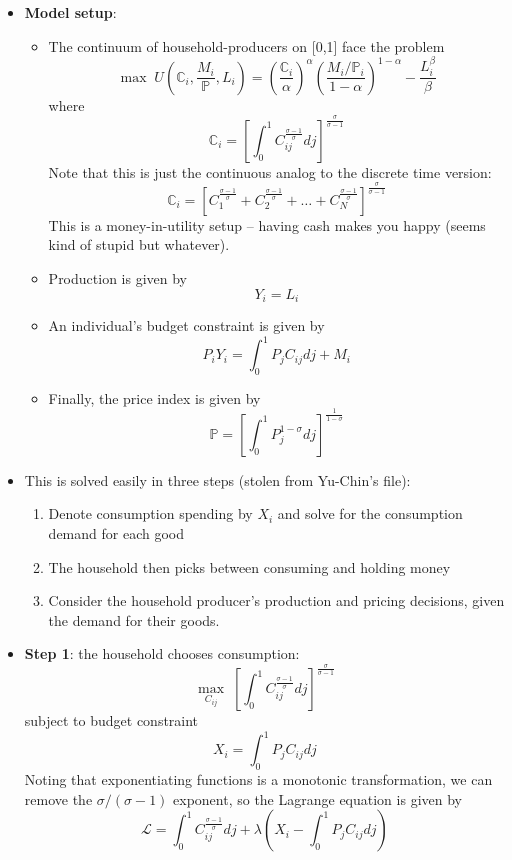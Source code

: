 \documentclass[12pt]{article}
\begin{document}
\begin{itemize}
    \item \textbf{Model setup}: 
    \begin{itemize}
        \item The continuum of household-producers on [0,1] face the problem
        \[\max\;U\left(\mathbb{C}_i, \frac{M_i}{\mathbb{P}}, L_i\right) = \left(\frac{\mathbb{C}_i}{\alpha}\right)^{\alpha}\left(\frac{M_i/\mathbb{P}_i}{1-\alpha}\right)^{1-\alpha} - \frac{L_i^{\beta}}{\beta}\]
        where
        \[\mathbb{C}_i = \left[\int_0^1C_{ij}^{\frac{\sigma - 1}{\sigma}}dj\right]^{\frac{\sigma}{\sigma-1}}\]
        Note that this is just the continuous analog to the discrete time version:
        \[\mathbb{C}_i = \left[C_1^{\frac{\sigma - 1}{\sigma}} + C_2^{\frac{\sigma - 1}{\sigma}} + \hdots + C_N^{\frac{\sigma - 1}{\sigma}}\right]^{\frac{\sigma}{\sigma-1}}\]
        This is a money-in-utility setup -- having cash makes you happy (seems kind of stupid but whatever).
        \item Production is given by
        \[Y_i = L_i\]
        \item An individual's budget constraint is given by
        \[P_iY_i = \int_0^1P_jC_{ij}dj + M_i\]
        \item Finally, the price index is given by
        \[\mathbb{P} = \left[\int_0^1P_j^{1-\sigma}dj\right]^{\frac{1}{1-\sigma}}\]
    \end{itemize}
    \item This is solved easily in three steps (stolen from Yu-Chin's file):
    \begin{enumerate}
        \item Denote consumption spending by $X_i$ and solve for the consumption demand for each good
        \item The household then picks between consuming and holding money
        \item Consider the household producer's production and pricing decisions, given the demand for their goods.
    \end{enumerate}
    \item \textbf{Step 1}: the household chooses consumption:
    \[\max_{C_{ij}}\; \left[\int_0^1C_{ij}^{\frac{\sigma - 1}{\sigma}}dj\right]^{\frac{\sigma}{\sigma-1}}\]
    subject to budget constraint
    \[X_i = \int_0^1P_jC_{ij}dj\]
    Noting that exponentiating functions is a monotonic transformation, we can remove the $\sigma / (\sigma - 1)$ exponent, so the Lagrange equation is given by
    \[\mathcal{L} = \int_0^1C_{ij}^{\frac{\sigma - 1}{\sigma}}dj + \lambda\left(X_i - \int_0^1P_jC_{ij}dj\right)\]

\end{itemize}
\end{document}
